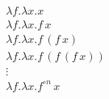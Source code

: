 \documentclass{article}
\begin{document}
\begin{gather*}
	\lambda f.\lambda x.x \\
	\lambda f.\lambda x.f\, x \\
	\lambda f.\lambda x.f\, (f\, x) \\
	\lambda f.\lambda x.f\, (f\, (f\, x)) \\
	\vdots \\
	\lambda f.\lambda x.f^{\circ n}\, x
\end{gather*}
\end{document}
